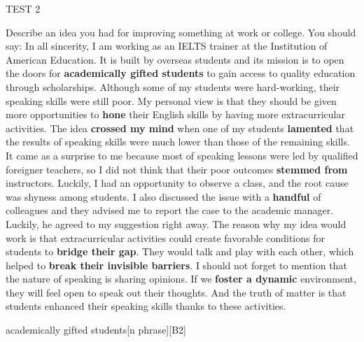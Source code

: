 \begin{glossarymc}[Cambridge 7]
\begin{test}{TEST 2}
\begin{qa}{Describe an idea you had for improving something at work or college. You should say:}
    In all sincerity, I am working as an IELTS trainer at the Institution of American Education. It is built by overseas students and its mission is to open the doors for \textbf{academically gifted students} to gain access to quality education through scholarships. Although some of my students were hard-working, their speaking skills were still poor. My personal view is that they should be given more opportunities to \textbf{hone} their English skills by having more extracurricular activities. The idea \textbf{crossed my mind} when one of my students \textbf{lamented} that the results of speaking skills were much lower than those of the remaining skills. It came as a surprise to me because most of speaking lessons were led by qualified foreigner teachers, so I did not think that their poor outcomes \textbf{stemmed from} instructors. Luckily, I had an opportunity to observe a class, and the root cause was shyness among students. I also discussed the issue with a \textbf{handful} of colleagues and they advised me to report the case to the academic manager. Luckily, he agreed to my suggestion right away. The reason why my idea would work is that extracurricular activities could create favorable conditions for students to \textbf{bridge their gap}. They would talk and play with each other, which helped to \textbf{break their invisible barriers}. I should not forget to mention that the nature of speaking is sharing opinions. If we \textbf{foster a dynamic} environment, they will feel open to speak out their thoughts. And the truth of matter is that students enhanced their speaking skills thanks to these activities.
    \end{qa}

        \begin{VocabExplain}[Part 2]
            \begin{ExplainCard}{academically gifted students}[n phrase][B2]
            \end{ExplainCard}


\end{VocabExplain}
\end{test}
\end{glossarymc}
